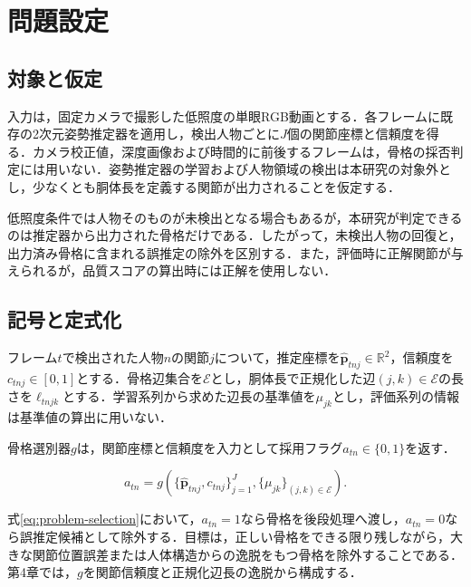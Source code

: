 \chapter{問題設定}

\begin{center}
  \UsamiFictionalExampleNotice
\end{center}

\section{対象と仮定}

入力は，固定カメラで撮影した低照度の単眼RGB動画とする．各フレームに既存の2次元姿勢推定器を適用し，検出人物ごとに$J$個の関節座標と信頼度を得る．カメラ校正値，深度画像および時間的に前後するフレームは，骨格の採否判定には用いない．姿勢推定器の学習および人物領域の検出は本研究の対象外とし，少なくとも胴体長を定義する関節が出力されることを仮定する．

低照度条件では人物そのものが未検出となる場合もあるが，本研究が判定できるのは推定器から出力された骨格だけである．したがって，未検出人物の回復と，出力済み骨格に含まれる誤推定の除外を区別する．また，評価時に正解関節が与えられるが，品質スコアの算出時には正解を使用しない．

\section{記号と定式化}

フレーム$t$で検出された人物$n$の関節$j$について，推定座標を$\hat{\bm{p}}_{tnj}\in\mathbb{R}^{2}$，信頼度を$c_{tnj}\in[0,1]$とする．骨格辺集合を$\mathcal{E}$とし，胴体長で正規化した辺$(j,k)\in\mathcal{E}$の長さを$\ell_{tnjk}$とする．学習系列から求めた辺長の基準値を$\mu_{jk}$とし，評価系列の情報は基準値の算出に用いない．

骨格選別器$g$は，関節座標と信頼度を入力として採用フラグ$a_{tn}\in\{0,1\}$を返す．

\begin{equation}
  a_{tn}
  =g\!\left(
    \{\hat{\bm{p}}_{tnj},c_{tnj}\}_{j=1}^{J},
    \{\mu_{jk}\}_{(j,k)\in\mathcal{E}}
  \right).
  \label{eq:problem-selection}
\end{equation}

式\eqref{eq:problem-selection}において，$a_{tn}=1$なら骨格を後段処理へ渡し，$a_{tn}=0$なら誤推定候補として除外する．目標は，正しい骨格をできる限り残しながら，大きな関節位置誤差または人体構造からの逸脱をもつ骨格を除外することである．第4章では，$g$を関節信頼度と正規化辺長の逸脱から構成する．


